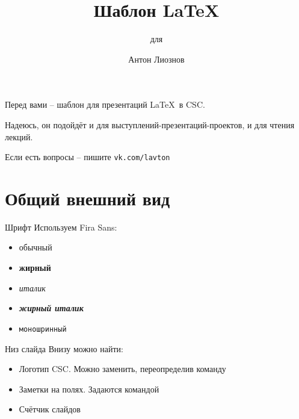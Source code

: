 \documentclass[12pt, aspectratio=43]{beamer}
\begin{document}
    \title{Шаблон \LaTeX}
    \subtitle{для \CSC}
    \author{Антон Лиознов}
    \institute{\CSC}
    \date{\the\year}
    \frame{\titlepage}
    \begin{frame}\relax
    Перед вами -- шаблон для презентаций \LaTeX\ в CSC. 
    
    Надеюсь, он подойдёт и для выступлений-презентаций-проектов, и для чтения лекций.
    
    
    Если есть вопросы -- пишите \texttt{vk.com/lavton}
    \end{frame}
    
    \section{Общий внешний вид}
    \begin{frame}{Шрифт}\relax
        Используем Fira Sans:
        \begin{itemize}
            \item обычный
            \item \textbf{жирный}
            \item \textit{италик}
            \item \textit{\textbf{жирный италик}}
            \item \texttt{моношринный}
        \end{itemize}
    \end{frame}
    
    \begin{frame}{Низ слайда}\relax
        Внизу можно найти:
        \begin{itemize}
            \item Логотип CSC. Можно заменить, переопределив команду \texttt{\string\logoname}
            \item Заметки на полях. Задаются командой \texttt{\string\cscfootnote}
            \item Счётчик слайдов
             
        \end{itemize}
    \end{frame}
    
\end{document}
